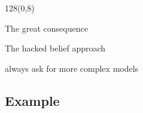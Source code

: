\documentclass[shownotes]{beamer}
\begin{document}
\begin{frame}
 \begin{textblock}{128}(0,8)
\begin{center}
 \large The great consequence
\end{center}
\end{textblock}


 \begin{mdframed}
  \centering The hacked belief approach 
  
  always ask for more complex models 
 \end{mdframed}
 


\end{frame}




\subsection{Example}
\end{document}
